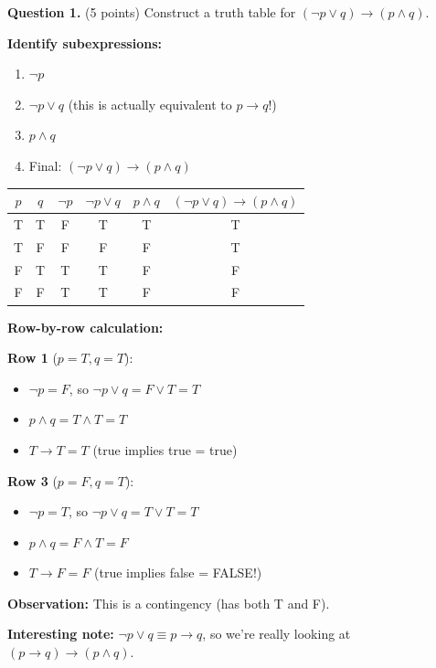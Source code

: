 \documentclass[11pt,a4paper]{article}
\begin{document}
\textbf{Question 1.} (5 points) Construct a truth table for $(\neg p \lor q) \to (p \land q)$.

\begin{solnbox}
\textbf{Identify subexpressions:}
\begin{enumerate}[noitemsep]
    \item $\neg p$
    \item $\neg p \lor q$ (this is actually equivalent to $p \to q$!)
    \item $p \land q$
    \item Final: $(\neg p \lor q) \to (p \land q)$
\end{enumerate}

\begin{center}
\begin{tabular}{cc|c|cc|c}
\toprule
$p$ & $q$ & $\neg p$ & $\neg p \lor q$ & $p \land q$ & $(\neg p \lor q) \to (p \land q)$ \\
\midrule
T & T & F & T & T & T \\
T & F & F & F & F & T \\
F & T & T & T & F & F \\
F & F & T & T & F & F \\
\bottomrule
\end{tabular}
\end{center}

\textbf{Row-by-row calculation:}

\textbf{Row 1} ($p=T, q=T$):
\begin{itemize}[noitemsep]
    \item $\neg p = F$, so $\neg p \lor q = F \lor T = T$
    \item $p \land q = T \land T = T$
    \item $T \to T = T$ (true implies true = true)
\end{itemize}

\textbf{Row 3} ($p=F, q=T$):
\begin{itemize}[noitemsep]
    \item $\neg p = T$, so $\neg p \lor q = T \lor T = T$
    \item $p \land q = F \land T = F$
    \item $T \to F = F$ (true implies false = FALSE!)
\end{itemize}

\textbf{Observation:} This is a contingency (has both T and F).

\textbf{Interesting note:} $\neg p \lor q \equiv p \to q$, so we're really looking at $(p \to q) \to (p \land q)$.
\end{solnbox}
\end{document}
